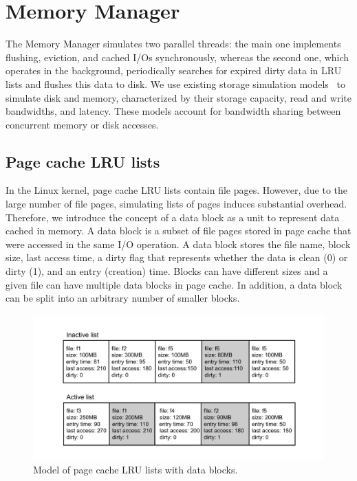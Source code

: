 \section{Memory Manager}

The Memory Manager simulates two parallel threads: the main one
implements flushing, eviction, and cached I/Os synchronously, whereas
the second one, which operates in the background, periodically searches for
expired dirty data in LRU lists and flushes this data to disk. We
use existing storage simulation models~\cite{lebre2015} to simulate disk and
memory, characterized by their storage capacity, read and write
bandwidths, and latency. These models account for
bandwidth sharing between concurrent memory or disk accesses.

\subsection{Page cache LRU lists}

In the Linux kernel, page cache LRU lists contain file pages. However,
due to the large number of file pages, simulating lists of pages
induces substantial overhead.
Therefore, we introduce the concept of a data block as a unit to represent data
cached in memory. A data block is a subset of file pages stored in
page cache that were accessed in the same I/O operation.
A data block stores the file name, block size, last access
time, a dirty flag that represents whether the data is clean (0)
or dirty (1), and an entry (creation) time.
Blocks can have different sizes and a given file can have multiple
data blocks in page cache. In addition, a data block can be split into an
arbitrary number of smaller blocks.
\begin{figure}
       \centering
       \includegraphics[width=\columnwidth]{figures/lru_lists.pdf}
       \caption{Model of page cache LRU lists with data blocks.}
       \label{fig:lrulist}
\end{figure}

